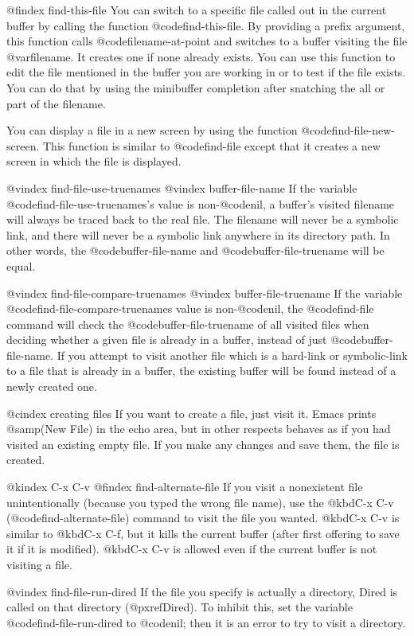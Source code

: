 {{{{{{{{{{{{{{{{@findex find-this-file
You can switch to a specific file called out in the current buffer by
calling the function @code{find-this-file}. By providing a prefix
argument, this function calls @code{filename-at-point} and switches to a
buffer visiting the file @var{filename}. It creates one if none already
exists. You can use this function to edit the file mentioned in the
buffer you are working in or to test if the file exists. You can do that
by using the minibuffer completion after snatching the all or part of
the filename.

 You can display a file in a new screen by using the function
@code{find-file-new-screen}. This function is similar to
@code{find-file} except that it creates a new screen in which the file
is displayed.

@vindex find-file-use-truenames
@vindex buffer-file-name
If the variable @code{find-file-use-truenames}'s value is
non-@code{nil}, a buffer's visited filename will always be traced back
to the real file. The filename will never be a symbolic link, and there
will never be a symbolic link anywhere in its directory path. In other
words, the @code{buffer-file-name} and @code{buffer-file-truename} will
be equal.

@vindex find-file-compare-truenames
@vindex buffer-file-truename
If the variable @code{find-file-compare-truenames} value is
non-@code{nil}, the @code{find-file} command will check the
@code{buffer-file-truename} of all visited files when deciding whether a
given file is already in a buffer, instead of just
@code{buffer-file-name}.  If you attempt to visit another file which is
a hard-link or symbolic-link to a file that is already in a buffer, the
existing buffer will be found instead of a newly created one.

@cindex creating files
   If you want to create a file, just visit it.  Emacs prints
@samp{(New File)} in the echo area, but in other respects behaves as if you
had visited an existing empty file.  If you make any changes and save them,
the file is created.

@kindex C-x C-v
@findex find-alternate-file
  If you visit a nonexistent file unintentionally (because you typed the
wrong file name), use the @kbd{C-x C-v} (@code{find-alternate-file})
command to visit the file you wanted.  @kbd{C-x C-v} is similar to @kbd{C-x
C-f}, but it kills the current buffer (after first offering to save it if
it is modified).  @kbd{C-x C-v} is allowed even if the current buffer
is not visiting a file.

@vindex find-file-run-dired
  If the file you specify is actually a directory, Dired is called on
that directory (@pxref{Dired}).  To inhibit this, set the variable
@code{find-file-run-dired} to @code{nil}; then it is an error to try to
visit a directory.

}}}}}}}}}}}}}}}}
